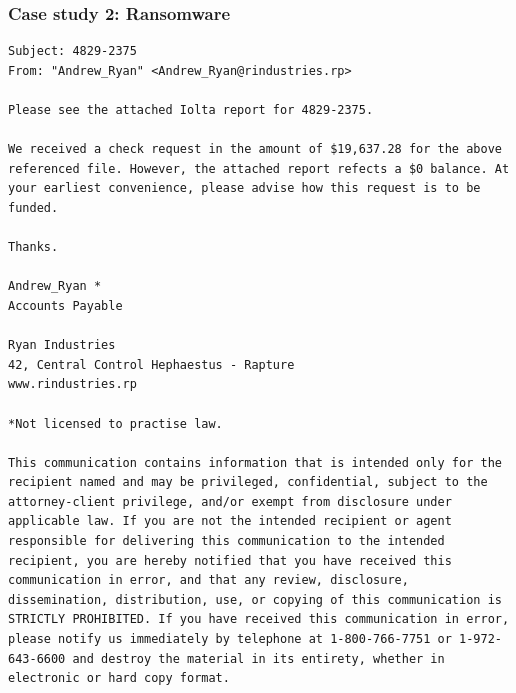 \begin{frame}[fragile]
    \frametitle{Case study 2: Ransomware}
\begin{lstlisting}[basicstyle=\tiny\color{black}]
Subject: 4829-2375
From: "Andrew_Ryan" <Andrew_Ryan@rindustries.rp>

Please see the attached Iolta report for 4829-2375.

We received a check request in the amount of $19,637.28 for the above referenced file. However, the attached report refects a $0 balance. At your earliest convenience, please advise how this request is to be funded.

Thanks.

Andrew_Ryan *
Accounts Payable

Ryan Industries
42, Central Control Hephaestus - Rapture
www.rindustries.rp

*Not licensed to practise law.

This communication contains information that is intended only for the recipient named and may be privileged, confidential, subject to the attorney-client privilege, and/or exempt from disclosure under applicable law. If you are not the intended recipient or agent responsible for delivering this communication to the intended recipient, you are hereby notified that you have received this communication in error, and that any review, disclosure, dissemination, distribution, use, or copying of this communication is STRICTLY PROHIBITED. If you have received this communication in error, please notify us immediately by telephone at 1-800-766-7751 or 1-972-643-6600 and destroy the material in its entirety, whether in electronic or hard copy format.
\end{lstlisting}

\end{frame}

